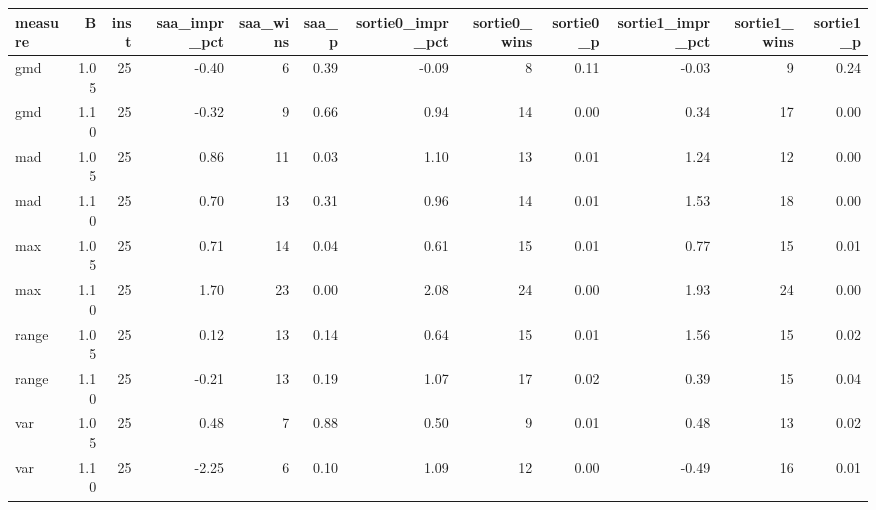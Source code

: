 \begin{tabular}{lrrrrrrrrrrr}
\toprule
measure & B & inst & saa_impr_pct & saa_wins & saa_p & sortie0_impr_pct & sortie0_wins & sortie0_p & sortie1_impr_pct & sortie1_wins & sortie1_p \\
\midrule
gmd & 1.05 & 25 & -0.40 & 6 & 0.39 & -0.09 & 8 & 0.11 & -0.03 & 9 & 0.24 \\
gmd & 1.10 & 25 & -0.32 & 9 & 0.66 & 0.94 & 14 & 0.00 & 0.34 & 17 & 0.00 \\
mad & 1.05 & 25 & 0.86 & 11 & 0.03 & 1.10 & 13 & 0.01 & 1.24 & 12 & 0.00 \\
mad & 1.10 & 25 & 0.70 & 13 & 0.31 & 0.96 & 14 & 0.01 & 1.53 & 18 & 0.00 \\
max & 1.05 & 25 & 0.71 & 14 & 0.04 & 0.61 & 15 & 0.01 & 0.77 & 15 & 0.01 \\
max & 1.10 & 25 & 1.70 & 23 & 0.00 & 2.08 & 24 & 0.00 & 1.93 & 24 & 0.00 \\
range & 1.05 & 25 & 0.12 & 13 & 0.14 & 0.64 & 15 & 0.01 & 1.56 & 15 & 0.02 \\
range & 1.10 & 25 & -0.21 & 13 & 0.19 & 1.07 & 17 & 0.02 & 0.39 & 15 & 0.04 \\
var & 1.05 & 25 & 0.48 & 7 & 0.88 & 0.50 & 9 & 0.01 & 0.48 & 13 & 0.02 \\
var & 1.10 & 25 & -2.25 & 6 & 0.10 & 1.09 & 12 & 0.00 & -0.49 & 16 & 0.01 \\
\bottomrule
\end{tabular}
